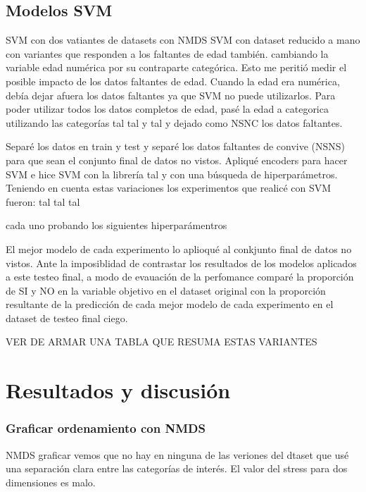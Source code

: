 \documentclass[10 pt]{article}
\begin{document}
\subsection{Modelos SVM}\label{svm}



SVM con dos vatiantes de datasets con NMDS
SVM con dataset reducido a mano con variantes que responden a los faltantes de edad también. cambiando la variable edad numérica por su contraparte categórica. Esto me peritió medir el posible impacto de los datos faltantes de edad. Cuando la edad era numérica, debía dejar afuera los datos faltantes ya que SVM no puede utilizarlos. Para poder utilizar todos los datos completos de edad, pasé la edad a categorica  utilizando las categorías tal tal y tal y dejado como NSNC los datos faltantes.

Separé los datos en train y test y separé los datos faltantes de convive (NSNS) para que sean el conjunto final de datos no vistos.  
Apliqué encoders para hacer SVM e hice SVM con la librería tal y con una búsqueda de hiperparámetros.  Teniendo en cuenta estas variaciones los experimentos que realicé con SVM fueron: 
tal tal tal

cada uno probando los siguientes hiperparámentros

El mejor modelo de cada experimento lo aplioqué al conkjunto final de datos no vistos. Ante la imposiblidad de contrastar los resultados de los modelos aplicados a este testeo final, a modo de evauación de la perfomance comparé la proporción de SI y NO en la variable objetivo en el dataset original con la proporción resultante de la predicción de cada mejor modelo de cada experimento en el dataset de testeo final ciego.

VER DE ARMAR UNA TABLA QUE RESUMA ESTAS VARIANTES 


\section{Resultados y discusión}\label{resultados}

\subsubsection{Graficar ordenamiento con NMDS}

NMDS graficar vemos que no hay en ninguna de las veriones del dtaset que usé una separación clara entre las categorías de interés. El valor del stress para dos dimensiones es malo.
\end{document}
